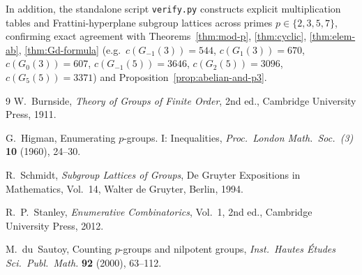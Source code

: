 \documentclass[11pt,a4paper]{article}
\theoremstyle{definition}
\begin{document}
In addition, the standalone script \texttt{verify.py} constructs explicit multiplication tables and Frattini-hyperplane subgroup lattices across primes $p \in \{2, 3, 5, 7\}$, confirming exact agreement with Theorems~\ref{thm:mod-p}, \ref{thm:cyclic}, \ref{thm:elem-ab}, \ref{thm:Gd-formula} (e.g.\ $c(G_{-1}(3)) = 544$, $c(G_1(3)) = 670$, $c(G_0(3)) = 607$, $c(G_{-1}(5)) = 3646$, $c(G_2(5)) = 3096$, $c(G_5(5)) = 3371$) and Proposition~\ref{prop:abelian-and-p3}.

\begin{thebibliography}{9}
W.~Burnside, \emph{Theory of Groups of Finite Order}, 2nd ed., Cambridge University Press, 1911.

G.~Higman, Enumerating $p$-groups. I: Inequalities, \emph{Proc.\ London Math.\ Soc.\ (3)} \textbf{10} (1960), 24--30.

R.~Schmidt, \emph{Subgroup Lattices of Groups}, De Gruyter Expositions in Mathematics, Vol.~14, Walter de Gruyter, Berlin, 1994.

R.~P.~Stanley, \emph{Enumerative Combinatorics}, Vol.~1, 2nd ed., Cambridge University Press, 2012.

M.~du~Sautoy, Counting $p$-groups and nilpotent groups, \emph{Inst.\ Hautes \'Etudes Sci.\ Publ.\ Math.} \textbf{92} (2000), 63--112.
\end{thebibliography}
\end{document}
